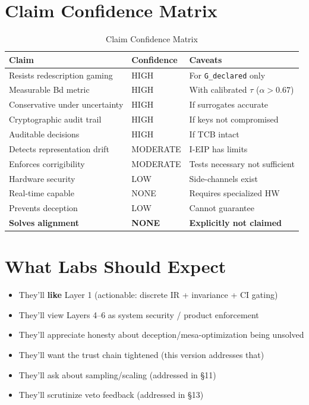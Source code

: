 \documentclass[11pt,letterpaper]{article}
\theoremstyle{definition}
\theoremstyle{remark}
\begin{document}
\section{Claim Confidence Matrix}

\begin{table}[h]
\centering
\small
\begin{tabular}{@{}lll@{}}
\toprule
\textbf{Claim} & \textbf{Confidence} & \textbf{Caveats} \\
\midrule
Resists redescription gaming & HIGH & For \texttt{G\_declared} only \\
Measurable Bd metric & HIGH & With calibrated $\tau$ ($\alpha > 0.67$) \\
Conservative under uncertainty & HIGH & If surrogates accurate \\
Cryptographic audit trail & HIGH & If keys not compromised \\
Auditable decisions & HIGH & If TCB intact \\
Detects representation drift & MODERATE & I-EIP has limits \\
Enforces corrigibility & MODERATE & Tests necessary not sufficient \\
Hardware security & LOW & Side-channels exist \\
Real-time capable & NONE & Requires specialized HW \\
Prevents deception & LOW & Cannot guarantee \\
\textbf{Solves alignment} & \textbf{NONE} & \textbf{Explicitly not claimed} \\
\bottomrule
\end{tabular}
\caption{Claim Confidence Matrix}
\end{table}

\section{What Labs Should Expect}

\begin{itemize}
\item They'll \textbf{like} Layer 1 (actionable: discrete IR + invariance + CI gating)
\item They'll view Layers 4--6 as system security / product enforcement
\item They'll appreciate honesty about deception/mesa-optimization being unsolved
\item They'll want the trust chain tightened (this version addresses that)
\item They'll ask about sampling/scaling (addressed in \S11)
\item They'll scrutinize veto feedback (addressed in \S13)
\end{itemize}
\end{document}
